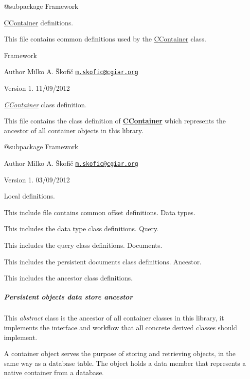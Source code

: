 \begin{DoxyVerb} @subpackage        Framework\end{DoxyVerb}


\hyperlink{class_c_container}{C\-Container} definitions.

This file contains common definitions used by the \hyperlink{class_c_container}{C\-Container} class.

Framework

\begin{DoxyAuthor}{Author}
Milko A. Škofič \href{mailto:m.skofic@cgiar.org}{\tt m.\-skofic@cgiar.\-org} 
\end{DoxyAuthor}
\begin{DoxyVersion}{Version}
1. 11/09/2012
\end{DoxyVersion}
{\itshape \hyperlink{class_c_container}{C\-Container}} class definition.

This file contains the class definition of {\bfseries \hyperlink{class_c_container}{C\-Container}} which represents the ancestor of all container objects in this library.

\begin{DoxyVerb} @subpackage        Framework
\end{DoxyVerb}


\begin{DoxyAuthor}{Author}
Milko A. Škofič \href{mailto:m.skofic@cgiar.org}{\tt m.\-skofic@cgiar.\-org} 
\end{DoxyAuthor}
\begin{DoxyVersion}{Version}
1. 03/09/2012
\end{DoxyVersion}
Local definitions.

This include file contains common offset definitions. Data types.

This includes the data type class definitions. Query.

This includes the query class definitions. Documents.

This includes the persistent documents class definitions. Ancestor.

This includes the ancestor class definitions. \subparagraph*{Persistent objects data store ancestor}

This {\itshape abstract} class is the ancestor of all container classes in this library, it implements the interface and workflow that all concrete derived classes should implement.

A container object serves the purpose of storing and retrieving objects, in the same way as a database table. The object holds a data member that represents a native container from a database.

